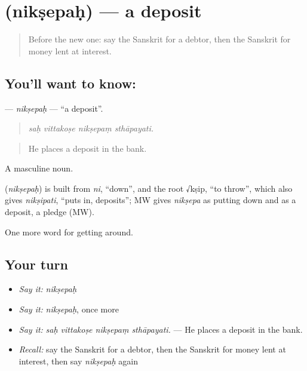\section[\texorpdfstring{\sk{निक्षेपः} (nikṣepaḥ)}{निक्षेपः (nikṣepaḥ)}]{ (nikṣepaḥ) — a deposit}

\label{lesson:SA-C434-niksepah}



\begin{quote}
Before the new one: say the Sanskrit for a debtor, then the Sanskrit for money lent at interest.
\end{quote}

\subsection*{You'll want to know: }
\textbf{} — \emph{nikṣepaḥ} — \textquotedblleft{}a deposit\textquotedblright{}.

\begin{quote}
   
\end{quote}

\begin{quote}
\emph{saḥ vittakoṣe nikṣepaṃ sthāpayati.}
\end{quote}

\begin{quote}
He places a deposit in the bank.
\end{quote}

A masculine noun.

\begin{cousinweb}
\textbf{} (\emph{nikṣepaḥ}) is built from \emph{ni}, \textquotedblleft{}down\textquotedblright{}, and the root √kṣip, \textquotedblleft{}to throw\textquotedblright{}, which also gives \emph{nikṣipati}, \textquotedblleft{}puts in, deposits\textquotedblright{}; MW gives \emph{nikṣepa} as putting down and as a deposit, a pledge (MW).
\end{cousinweb}

\begin{grammarlens}[title={What you've built}]
One more word for getting around.
\end{grammarlens}

\subsection*{Your turn}
\begin{itemize}
\raggedright
  \item \emph{Say it:} \emph{nikṣepaḥ}
  \item \emph{Say it:} \emph{nikṣepaḥ}, once more
  \item \emph{Say it:} \emph{saḥ vittakoṣe nikṣepaṃ sthāpayati.} — He places a deposit in the bank.
  \item \emph{Recall:} say the Sanskrit for a debtor, then the Sanskrit for money lent at interest, then say \emph{nikṣepaḥ} again
\end{itemize}

